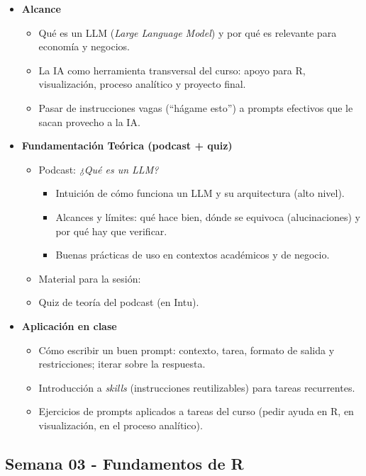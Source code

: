 \documentclass{article}
\begin{document}
\begin{itemize}
\item \textbf{Alcance}
\begin{itemize}
  \item Qué es un LLM (\textit{Large Language Model}) y por qué es relevante para economía y negocios.
  \item La IA como herramienta transversal del curso: apoyo para R, visualización, proceso analítico y proyecto final.
  \item Pasar de instrucciones vagas (``hágame esto'') a prompts efectivos que le sacan provecho a la IA.
\end{itemize}

\item \textbf{Fundamentación Teórica (podcast + quiz)}
\begin{itemize}
  \item Podcast: \emph{¿Qué es un LLM?} %
  \begin{itemize}
    \item Intuición de cómo funciona un LLM y su arquitectura (alto nivel).
    \item Alcances y límites: qué hace bien, dónde se equivoca (alucinaciones) y por qué hay que verificar.
    \item Buenas prácticas de uso en contextos académicos y de negocio.
  \end{itemize}
  \item Material para la sesión: %
  \item Quiz de teoría del podcast (en Intu).
\end{itemize}

\item \textbf{Aplicación en clase}
\begin{itemize}
  \item Cómo escribir un buen prompt: contexto, tarea, formato de salida y restricciones; iterar sobre la respuesta.
  \item Introducción a \textit{skills} (instrucciones reutilizables) para tareas recurrentes.
  \item Ejercicios de prompts aplicados a tareas del curso (pedir ayuda en R, en visualización, en el proceso analítico).
\end{itemize}
\end{itemize}

\newpage
\subsection{Semana 03 - Fundamentos de R}
\vspace{0.2 cm}
\end{document}
